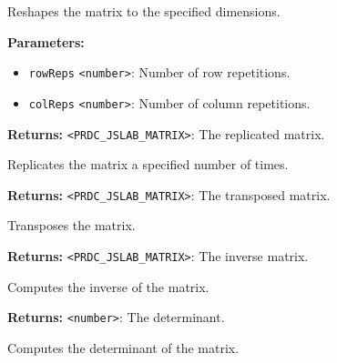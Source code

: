 \documentclass[12pt,a4paper]{article}
\begin{document}
\noindent Reshapes the matrix to the specified dimensions.

\vspace{5mm}
\noindent {}


\noindent \textbf{Parameters:}
\begin{itemize}
  \item \texttt{rowReps} \texttt{<number>}: Number of row repetitions.
  \item \texttt{colReps} \texttt{<number>}: Number of column repetitions.
\end{itemize}

\noindent \textbf{Returns:} \texttt{<PRDC\_JSLAB\_MATRIX>}: The replicated matrix.

\noindent Replicates the matrix a specified number of times.

\vspace{5mm}
\noindent {}


\noindent \textbf{Returns:} \texttt{<PRDC\_JSLAB\_MATRIX>}: The transposed matrix.

\noindent Transposes the matrix.

\vspace{5mm}
\noindent {}


\noindent \textbf{Returns:} \texttt{<PRDC\_JSLAB\_MATRIX>}: The inverse matrix.

\noindent Computes the inverse of the matrix.

\vspace{5mm}
\noindent {}


\noindent \textbf{Returns:} \texttt{<number>}: The determinant.

\noindent Computes the determinant of the matrix.

\vspace{5mm}
\noindent {}
\end{document}
